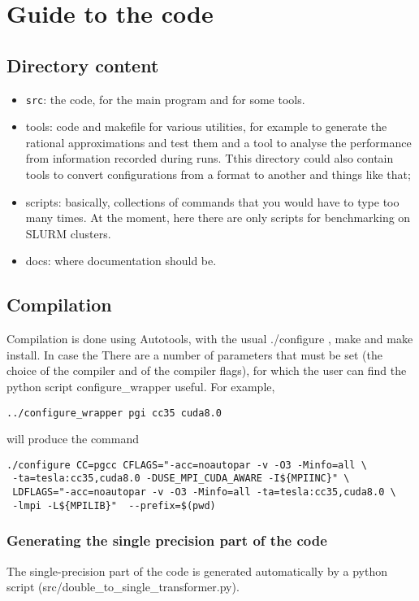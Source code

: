 
\chapter{Guide to the code}

\section{Directory content}

\begin{itemize}
    \item \texttt{src}: the code, for the main program and for some tools.
    \item tools: code and makefile for various utilities, for example to generate the rational approximations and test them and a tool to analyse the performance from information recorded during runs. Tthis directory could also contain tools to convert configurations from a format to another and things like that; 
    \item scripts: basically, collections of commands that you would have to type too many times. 
    At the moment, here there are only scripts for benchmarking on SLURM clusters.
    \item docs: where documentation should be.
\end{itemize}
\section{Compilation}
\label{compilation}
Compilation is done using Autotools, with the usual {\sf ./configure} , {\sf make} and {\sf make install}.
In case the 
There are a number of parameters that must be set (the choice of the compiler and of the compiler flags), for which the user can find the python script {\sf configure\_wrapper} useful. For example,

\begin{verbatim}
../configure_wrapper pgi cc35 cuda8.0
\end{verbatim}
will produce the command
\begin{verbatim}
./configure CC=pgcc CFLAGS="-acc=noautopar -v -O3 -Minfo=all \
 -ta=tesla:cc35,cuda8.0 -DUSE_MPI_CUDA_AWARE -I${MPIINC}" \
 LDFLAGS="-acc=noautopar -v -O3 -Minfo=all -ta=tesla:cc35,cuda8.0 \
 -lmpi -L${MPILIB}"  --prefix=$(pwd)
\end{verbatim}


\subsection{Generating the single precision part of the code}
The single-precision part of the code is generated automatically 
by a python script ({\sf src/double\_to\_single\_transformer.py}).

